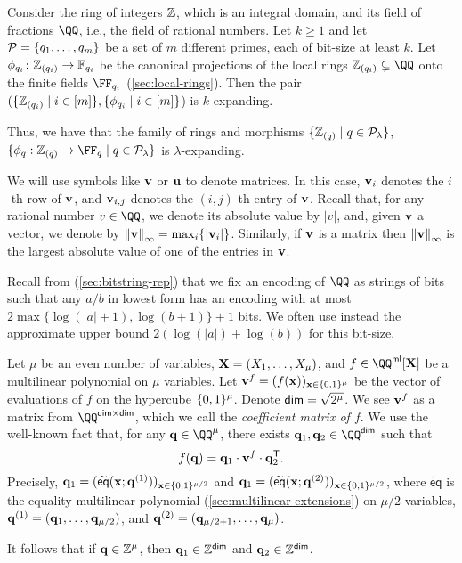 \documentclass[11pt,letterpaper,usenames,dvipsnames]{article}
\begin{document}
\begin{proposition}
\label{prop:bounded-rationals-and-localizations-are-expanding}
Consider the ring of integers $\mathbb{Z}$, which is an integral domain, and its field of fractions $\QQ$, i.e., the field of rational numbers. Let $k\geq 1$ and let $\mathcal{P}=\{q_1,\ldots, q_m\}$ be a set of $m$ different primes, each of bit-size at least $k$. Let $\phi_{q_i}\colon\mathbb{Z}_{(q_i)} \to \mathbb{F}_{q_i}$ be the canonical projections of the local rings $\local{q_i}\subsetneq \QQ$ onto the finite fields $\FF_{q_i}$ (\cref{sec:local-rings}). Then the pair $(\{\mathbb{Z}_{(q_i)}\mid i\in[m]\}, \{ \phi_{q_i} \mid i\in[m]\}$) is $k$-expanding.  
\end{proposition}

Thus, we have that the family of rings and morphisms $\{\mathbb{Z}_{(q)}\mid q\in {\mathcal{P}_{\lambda}}\}$, $\{\phi_q: \local{q} \to \FF_q \mid q\in \primeset\}$ is $\lambda$-expanding.

We will use symbols like $\mathbf{v}$ or $\mathbf{u}$ to denote matrices. In this case, $\mathbf{v}_{i}$ denotes the $i$-th row of $\mathbf{v}$, and $\mathbf{v}_{i,j}$ denotes the $(i,j)$-th entry of $\mathbf{v}$.  Recall that, for any rational number $v\in\QQ$, we denote its absolute value by $|v|$, and, given $\mathbf{v}$ a vector, we denote by $\left\lVert\mathbf{v}\right\rVert_{\infty} = \max_{i}\{|\mathbf{v}_i|\}$. Similarly, if $\mathbf{v}$ is a matrix then $\left\lVert\mathbf{v}\right\rVert_{\infty}$ is the largest absolute value of one of the entries in $\mathbf{v}$.

Recall from (\cref{sec:bitstring-rep}) that we fix an encoding of $\QQ$ as strings of bits such that any $a/b$ in lowest form has an encoding with at most $2\max\{\log(|a|+1),\log(b+1)\}  +1$ bits. We often use instead the  approximate upper bound  $2(\log(|a|)+\log(b))$ for this bit-size.

Let $\mu$ be an even number of variables, %
$\mathbf{X}=(X_1,\ldots, X_\mu)$, and $f\in \QQ^\multilin[\XX]$ be a multilinear polynomial on $\mu$ variables. Let   $\mathbf{v}^f = (f(\mathbf{x}))_{\mathbf{x}\in \{0,1\}^{\mu}}$ be the vector of evaluations of $f$ on the hypercube $\{0,1\}^\mu$. Denote $\mathsf{dim}=\sqrt{2^{\mu}}$. We see $\mathbf{v}^f$ as a matrix from $\QQ^{\codedim \times \codedim}$, which we call the \emph{coefficient matrix of $f$}. We use the well-known fact \cite{Thaler23} that, for any $\qq\in \QQ^{\mu}$, there exists $\qq_1,\qq_2\in \QQ^{\codedim}$ such that
\[
      f(\mathbf{q}) = \mathbf{q}_1 \cdot \mathbf{v}^f \cdot \mathbf{q}_2^{\mathsf{T}}.
\]
Precisely, $\mathbf{q}_1=(\widetilde{\mathsf{eq}}(\mathbf{x};\mathbf{q}^{(1)}))_{\mathbf{x}\in \{0,1\}^{\mu/2}}$ and $\mathbf{q}_1=(\widetilde{\mathsf{eq}}(\mathbf{x};\mathbf{q}^{(2)}))_{\mathbf{x}\in \{0,1\}^{\mu/2}}$, where $\widetilde{\mathsf{eq}}$ is the equality multilinear polynomial (\cref{sec:multilinear-extensions}) on $\mu/2$ variables, $\mathbf{q}^{(1)}=(\mathbf{q}_1,\ldots, \mathbf{q}_{\mu/2})$, and $\mathbf{q}^{(2)}= (\mathbf{q}_{\mu/2+1},\ldots, \mathbf{q}_{\mu})$.
%
\begin{remark}\label{r: q_always_integers}
It follows that if $\mathbf{q}\in \mathbb{Z}^{\mu}$, then $\mathbf{q}_1\in \mathbb{Z}^{\mathsf{dim}}$ and $\mathbf{q}_2\in \mathbb{Z}^{\mathsf{dim}}$.
\end{remark}
\end{document}
